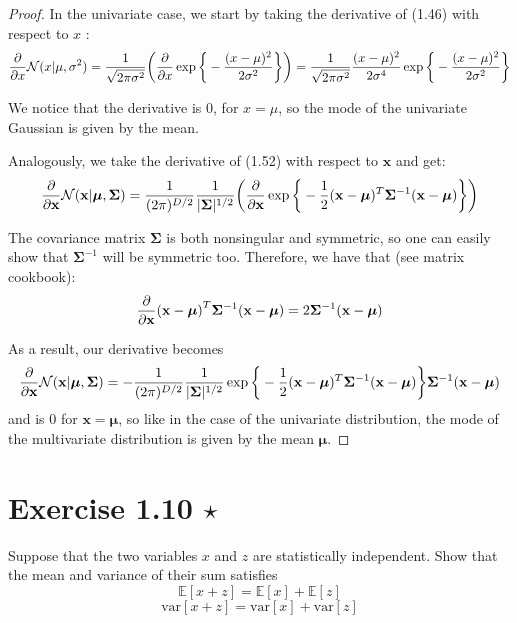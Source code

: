\begin{proof}
    In the univariate case, we start by taking the derivative of (1.46) with
    respect to $x$ :
    \[
        \pdv{x} \mathcal{N} (x | \mu, \sigma^2)
        = \frac{1}{\sqrt{2\pi \sigma^2}} \bigg(\pdv{x} \exp \bigg\{-\frac{(x - \mu)^2}{2\sigma^2}\bigg\}\bigg)
        = \frac{1}{\sqrt{2\pi \sigma^2}} \frac{(x - \mu)^2}{2\sigma^4} \exp \bigg\{-\frac{(x - \mu)^2}{2\sigma^2}\bigg\}
    \] 

    We notice that the derivative is 0, for $x = \mu$, so the mode of the univariate Gaussian is 
    given by the mean. 

    \vspace{1em}

    Analogously, we take the derivative of (1.52) with respect to $\mathbf{x}$ and get:
    \[
        \pdv{\mathbf{x}} \mathcal{N} (\mathbf{x} | \bm{\mu}, \mathbf{\Sigma})
        = \frac{1}{(2\pi)^{D/2}} \frac{1}{|\mathbf{\Sigma}|^{1/2}}
        \bigg(\pdv{\mathbf{x}} \exp \bigg\{-\frac{1}{2} 
            (\mathbf{x} - \bm{\mu})^T \mathbf{\Sigma}^{-1} (\mathbf{x} - \bm{\mu})\bigg\}\bigg)
    \] 

    The covariance matrix $\mathbf{\Sigma}$ is both nonsingular and symmetric, so one
    can easily show that $\mathbf{\Sigma}^{-1}$ 
    will be symmetric too. Therefore, we have that (see matrix cookbook):
    \[
        \pdv{\mathbf{x}} (\mathbf{x} - \bm{\mu})^T \mathbf{\Sigma}^{-1}(\mathbf{x} - \bm{\mu})
        = 2\mathbf{\Sigma}^{-1}(\mathbf{x} - \bm{\mu})
    \] 

    As a result, our derivative becomes
    \[
        \pdv{\mathbf{x}} \mathcal{N} (\mathbf{x} | \bm{\mu}, \mathbf{\Sigma})
        = -\frac{1}{(2\pi)^{D/2}} \frac{1}{|\mathbf{\Sigma}|^{1/2}}
        \exp \bigg\{-\frac{1}{2} 
            (\mathbf{x} - \bm{\mu})^T \mathbf{\Sigma}^{-1} (\mathbf{x} - \bm{\mu})\bigg\}
            \mathbf{\Sigma}^{-1}(\mathbf{x} - \bm{\mu})
    \]
    and is 0 for $\mathbf{x} = \bm{\mu}$, so like in the case of the univariate distribution,
    the mode of the multivariate distribution is given by the mean $\bm{\mu}$.
\end{proof}

\section*{Exercise 1.10 $\star$}
Suppose that the two variables $x$ and $z$ are statistically independent. Show that
the mean and variance of their sum satisfies
\begin{equation}\label{eq:1.128}\tag{1.128}
    \mathbb{E}[x + z] = \mathbb{E}[x] + \mathbb{E}[z]
\end{equation}
\vspace{-1em}
\begin{equation}\label{eq:1.129}\tag{1.129}
    \text{var}[x + z] = \text{var}[x] + \text{var}[z]
\end{equation}

